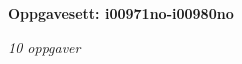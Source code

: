 \centerline{\bf Oppgavesett: i00971no-i00980no}
\vskip 10pt
\centerline{\it 10 oppgaver}\vskip 10pt
\vskip 10pt
